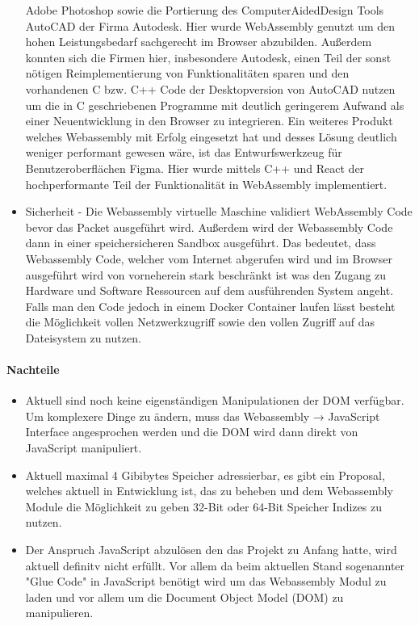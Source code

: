 \begin{itemize}
            Adobe Photoshop sowie die Portierung des ComputerAidedDesign Tools AutoCAD der Firma Autodesk. Hier wurde WebAssembly genutzt um den hohen Leistungsbedarf sachgerecht im Browser abzubilden.
            Außerdem konnten sich die Firmen hier, insbesondere Autodesk, einen Teil der sonst nötigen Reimplementierung von Funktionalitäten sparen und den vorhandenen C bzw. C++ Code der Desktopversion
            von AutoCAD nutzen um die in C geschriebenen Programme mit deutlich geringerem Aufwand als einer Neuentwicklung in den Browser zu integrieren. Ein weiteres Produkt welches Webassembly
        	mit Erfolg eingesetzt hat und desses Lösung deutlich weniger performant gewesen wäre, ist das Entwurfswerkzeug für Benutzeroberflächen Figma. Hier wurde mittels C++ und React der hochperformante Teil der Funktionalität
            in WebAssembly implementiert.
    \item   Sicherheit - Die Webassembly virtuelle Maschine validiert WebAssembly Code bevor das Packet ausgeführt wird. Außerdem wird der Webassembly Code dann in einer speichersicheren Sandbox ausgeführt.
            Das bedeutet, dass Webassembly Code, welcher vom Internet abgerufen wird und im Browser ausgeführt wird von vorneherein stark beschränkt ist was den Zugang zu Hardware und Software
            Ressourcen auf dem ausführenden System angeht. Falls man den Code jedoch in einem Docker Container laufen lässt besteht die Möglichkeit vollen Netzwerkzugriff sowie den vollen Zugriff auf das Dateisystem zu nutzen.
\end{itemize}
\paragraph*{Nachteile}
\begin{itemize}
    \item   Aktuell sind noch keine eigenständigen Manipulationen der DOM verfügbar. Um komplexere Dinge zu ändern, muss das Webassembly → JavaScript Interface angesprochen werden
            und die DOM wird dann direkt von JavaScript manipuliert.
    \item   Aktuell maximal 4 Gibibytes Speicher adressierbar, es gibt ein Proposal, welches aktuell in Entwicklung ist, das zu beheben und dem
            Webassembly Module die Möglichkeit zu geben 32-Bit oder 64-Bit Speicher Indizes zu nutzen.
    \item   Der Anspruch JavaScript abzulösen den das Projekt zu Anfang hatte, wird aktuell definitv nicht erfüllt. Vor allem da beim aktuellen Stand sogenannter "Glue Code" in JavaScript benötigt 
            wird um das Webassembly Modul zu laden und vor allem um die Document Object Model (DOM) zu manipulieren.
\end{itemize}
